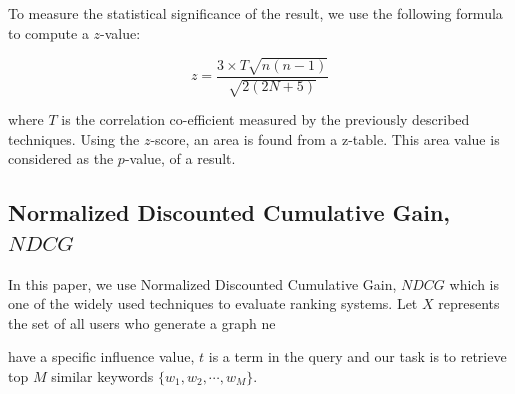 \documentclass[sigconf]{acmart}
\begin{document}
To measure the statistical significance of the result, we use the following formula to compute a $z$-value:

\begin{equation}
z = \dfrac{3 \times T \sqrt{n(n-1)}}{\sqrt{2(2N+5)}}
\end{equation}

where $T$ is the correlation co-efficient measured by the previously described techniques. Using the $z$-score, an area is found from a z-table. This area value is considered as the $p$-value,  of a result.


\subsection{Normalized Discounted Cumulative Gain, $NDCG$}
In this paper, we use Normalized Discounted Cumulative Gain, $NDCG$ which is one of the widely used techniques to evaluate ranking systems. Let $X$ represents the set of all users who generate a graph ne

have a specific influence value, $t$ is a term in the query and our task is to retrieve top $M$ similar keywords $\{w_1, w_2, \cdots, w_M\}$. 
\end{document}
